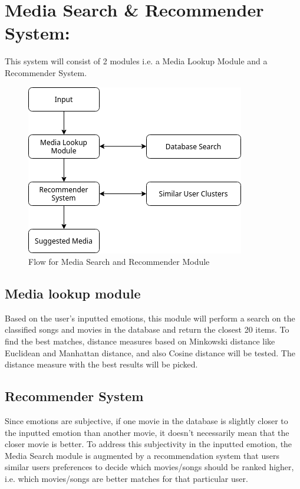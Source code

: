 \section{Media Search \& Recommender System:}
This system will consist of 2 modules i.e. a Media Lookup Module and a Recommender System.

\begin{figure}[H]
\centering
\includegraphics[scale=0.6]{imgs/mediaSearchuml.png}
\caption{Flow for Media Search and Recommender Module}

\label{fig: mediaUML}
\end{figure}
\subsection{Media lookup module}
Based on the user’s inputted emotions, this module will perform a search on the classified songs and movies in the database and return the closest 20 items. To find the best matches, distance measures based on Minkowski distance like Euclidean and Manhattan distance, and also Cosine distance will be tested. The distance measure with the best results will be picked.

\subsection{Recommender System}
Since emotions are subjective, if one movie in the database is slightly closer to the inputted emotion than another movie, it doesn't necessarily mean that the closer movie is better. To address this subjectivity in the inputted emotion, the Media Search module is augmented by a recommendation system that users similar users preferences to decide which movies/songs should be ranked higher, i.e. which movies/songs are better matches for that particular user. \newline


